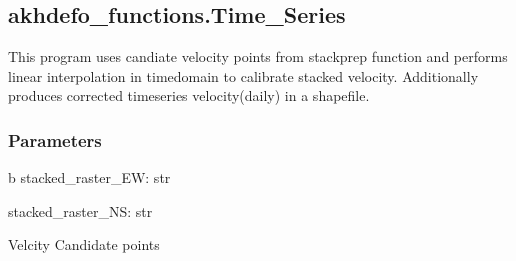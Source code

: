 \documentclass[letterpaper,10pt]{sphinxmanual}
\begin{document}
\sphinxstepscope


\subsection{akhdefo\_functions.Time\_Series}
\label{\detokenize{generated/akhdefo_functions.Time_Series:akhdefo-functions-time-series}}\label{\detokenize{generated/akhdefo_functions.Time_Series::doc}}

\begin{fulllineitems}
\label{\detokenize{generated/akhdefo_functions.Time_Series:akhdefo_functions.Time_Series}}
\pysigstartsignatures
{}
\pysigstopsignatures
\sphinxAtStartPar
This program uses candiate velocity points from stackprep function and performs linear interpolation in time\sphinxhyphen{}domain to calibrate
stacked velocity. Additionally produces corrected timeseries velocity(daily) in a shapefile.


\subsubsection{Parameters}
\label{\detokenize{generated/akhdefo_functions.Time_Series:parameters}}
\sphinxAtStartPar
b   
stacked\_raster\_EW: str

\sphinxAtStartPar
stacked\_raster\_NS: str
\begin{description}
\sphinxAtStartPar
Velcity Candidate points


\end{description}
\end{fulllineitems}
\end{document}
